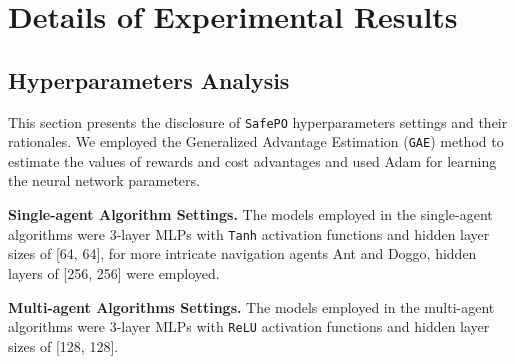 \documentclass{article}
\begin{document}
\newpage


\appendix
\newpage
\section{Details of Experimental Results}
\label{app:experiment_analysis}
\subsection{Hyperparameters Analysis}

This section presents the disclosure of \texttt{SafePO} hyperparameters settings and their rationales. We employed the Generalized Advantage Estimation (\texttt{GAE})\cite{schulman2015high} method to estimate the values of rewards and cost advantages and used Adam\cite{kingma2014adam} for learning the neural network parameters. 

\textbf{Single-agent Algorithm Settings.}
The models employed in the single-agent algorithms were 3-layer MLPs with \texttt{Tanh} activation functions and hidden layer sizes of [64, 64], for more intricate navigation agents Ant and Doggo, hidden layers of [256, 256] were employed. 

\textbf{Multi-agent Algorithms Settings.}
The models employed in the multi-agent algorithms were 3-layer MLPs with \texttt{ReLU} activation functions and hidden layer sizes of [128, 128]. 
\end{document}

